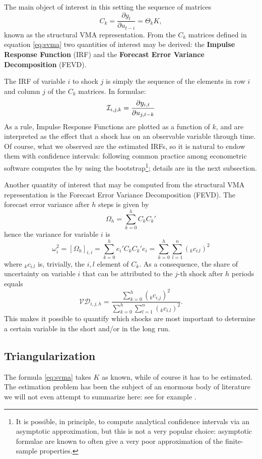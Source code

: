 The main object of interest in this setting the sequence of matrices
\begin{equation}
  \label{eq:svma}
  C_k = \frac{\partial y_t}{\partial u_{t-i}} = \Theta_k K, 
\end{equation}
known as the structural VMA representation. From the $C_k$ matrices
defined in equation \eqref{eq:svma} two quantities of interest may be
derived: the \textbf{Impulse Response Function} (IRF) and the
\textbf{Forecast Error Variance Decomposition} (FEVD).

The IRF of variable $i$ to shock $j$ is simply the sequence of the
elements in row $i$ and column $j$ of the $C_k$ matrices. In formulae:
\[
  \mathcal{I}_{i,j,k} = \frac{\partial y_{i,t}}{\partial u_{j, t-k}}
\]
As a rule, Impulse Response Functions are plotted as a function of
$k$, and are interpreted as the effect that a shock has on an
observable variable through time. Of course, what we observed are the
estimated IRFs, so it is natural to endow them with confidence
intervals: following common practice among econometric software
 computes the by using the bootstrap\footnote{It is
  possible, in principle, to compute analytical confidence intervals
  via an asymptotic approximation, but this is not a very popular
  choice: asymptotic formulae are known to often give a very poor
  approximation of the finite-sample properties.}; details are in the
next subsection.

Another quantity of interest that may be computed from the structural
VMA representation is the Forecast Error Variance Decomposition
(FEVD). The forecast error variance after $h$ steps is given by
\[
  \Omega_h = \sum_{k=0}^h C_k C_k'
\]
hence the variance for variable $i$ is
\[
  \omega^2_i = \left[ \Omega_h \right]_{i,i} = \sum_{k=0}^h e_i' C_k C_k' e_i =
  \sum_{k=0}^h \sum_{l=1}^n ({}_kc_{i.l})^2 
\]
where ${}_kc_{i.l}$ is, trivially, the $i,l$ element of $C_k$. As a
consequence, the share of uncertainty on variable $i$ that can be
attributed to the $j$-th shock after $h$ periods equals
\[
  \mathcal{VD}_{i,j,h} =
  \frac{\sum_{k=0}^h ({}_kc_{i.j})^2 }{  \sum_{k=0}^h \sum_{l=1}^n
    ({}_kc_{i.l})^2 } .
\]
This makes it possible to quantify which shocks are most important to
determine a certain variable in the short and/or in the long run.

\subsection{Triangularization}

The formula \ref{eq:svma} takes $K$ as known, while of course it has
to be estimated. The estimation problem has been the subject of an
enormous body of literature we will not even attempt to summarize
here: see for example \cite[chapter 9]{LKBook05}.

